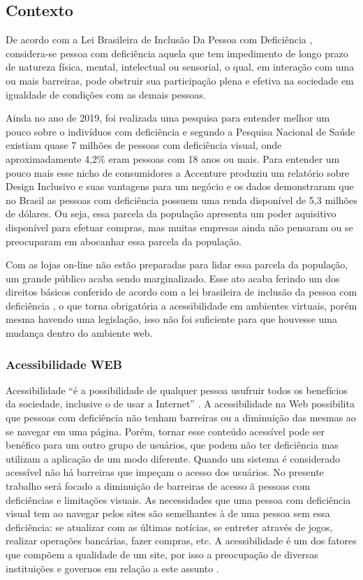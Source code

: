 \subsection{Contexto}
{

De acordo com a  Lei Brasileira de Inclusão Da Pessoa com Deficiência \cite{brasil2015}, 
considera-se pessoa com deficiência aquela que tem impedimento de longo prazo de natureza física, mental, intelectual ou sensorial, o qual, em interação com uma ou mais barreiras, pode obstruir sua participação plena e efetiva na sociedade em igualdade de condições com as demais pessoas.

Ainda no ano de 2019, foi realizada uma pesquisa para entender melhor um pouco sobre o indivíduos com deficiência e segundo a Pesquisa Nacional de Saúde \cite{PNS} existiam quase 7 milhões de pessoas com deficiência visual, onde aproximadamente 4,2\% eram pessoas com 18 anos ou mais. Para entender um pouco mais esse nicho de consumidores a Accenture produziu um relatório \cite{ACCENTURE} sobre Design Inclusivo e suas vantagens para um negócio e os dados demonstraram que no Brasil as pessoas com deficiência possuem uma renda disponível de 5,3 milhões de dólares. Ou seja, essa parcela da população apresenta um poder aquisitivo disponível para efetuar compras, mas muitas empresas ainda não pensaram ou se preocuparam em abocanhar essa parcela da população.  

Com as lojas on-line não estão preparadas para lidar essa parcela da população, um grande público acaba sendo marginalizado. Esse ato acaba ferindo um dos direitos básicos conferido de acordo com a lei brasileira de inclusão da pessoa com deficiência \cite{brasil2015}, o que torna obrigatória a acessibilidade em ambientes virtuais, porém mesma havendo uma legislação, isso não foi suficiente para que houvesse uma mudança dentro do ambiente web. 

 \subsubsection{Acessibilidade WEB}
 
 {Acessibilidade “é a possibilidade de qualquer pessoa usufruir todos os benefícios
da sociedade, inclusive o de usar a Internet” \cite{Ferreira_2015}. A acessibilidade na Web possibilita que pessoas com deficiência não tenham barreiras ou a diminuição das mesmas ao se navegar em uma página. Porém, tornar esse conteúdo acessível pode ser benéfico para um outro grupo de usuários, que podem não ter deficiência mas utilizam a aplicação de um modo diferente. \newpage
Quando um sistema é considerado acessível não há barreiras que impeçam o acesso dos usuários.
No presente trabalho será focado a diminuição de barreiras de acesso ã pessoas com deficiências e limitações visuais. As necessidades que uma pessoa com deficiência visual tem ao navegar pelos sites são semelhantes à de uma pessoa sem essa deficiência: se atualizar com as últimas notícias, se entreter através de jogos, realizar operações bancárias, fazer compras, etc. A acessibilidade é um dos fatores que compõem a qualidade de um site, por isso a preocupação de diversas instituições e governos em relação a este assunto \cite{sbqs}.

}}
